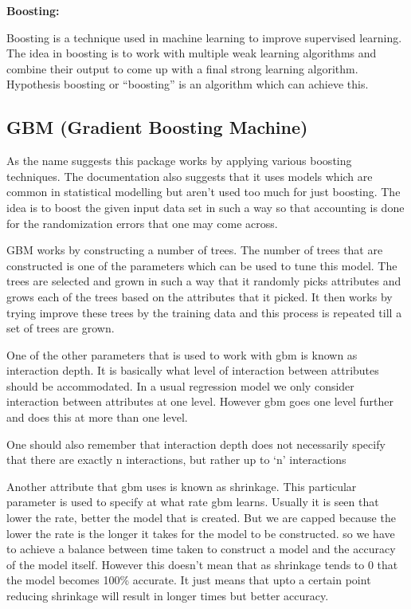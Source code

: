 \documentclass[paper=a4, fontsize=11pt]{scrartcl}	%
\numberwithin{equation}{section}		%
\numberwithin{figure}{section}			%
\numberwithin{table}{section}				%
\begin{document}
\begin{minipage}{\textwidth}

\textbf{Boosting:}

Boosting is a technique used in machine learning to improve supervised learning. The idea in boosting is to work with multiple weak learning algorithms and combine their output to come up with a final strong learning algorithm. Hypothesis boosting or ``boosting'' is an algorithm which can achieve this.
\end{minipage}

\subsection{GBM (Gradient Boosting Machine)}

As the name suggests this package works by applying various boosting techniques. The documentation also suggests that it uses models which are common in statistical modelling but aren't used too much for just boosting. The idea is to boost the given input data set in such a way so that accounting is done for the randomization errors that one may come across.

GBM works by constructing a number of trees. The number of trees that are constructed is one of the parameters which can be used to tune this model. The trees are selected and grown in such a way that it randomly picks attributes and grows each of the trees based on the attributes that it picked. It then works by trying improve these trees by the training data and this process is repeated till a set of trees are grown. 

One of the other parameters that is used to work with gbm is known as interaction depth. It is basically what level of interaction between attributes should be accommodated. In a usual regression model we only consider interaction between attributes at one level. However gbm goes one level further and does this at more than one level.

One should also remember that interaction depth does not necessarily specify that there are exactly n interactions, but rather up to `n' interactions

Another attribute that gbm uses is known as shrinkage. This particular parameter is used to specify at what rate gbm learns. Usually it is seen that lower the rate, better the model that is created. But we are capped because the lower the rate is the longer it takes for the model to be constructed. so we have to achieve a balance between time taken to construct a model and the accuracy of the model itself. However this doesn't mean that as shrinkage tends to 0 that the model becomes 100\% accurate. It just means that upto a certain point reducing shrinkage will result in longer times but better accuracy.
\end{document}
